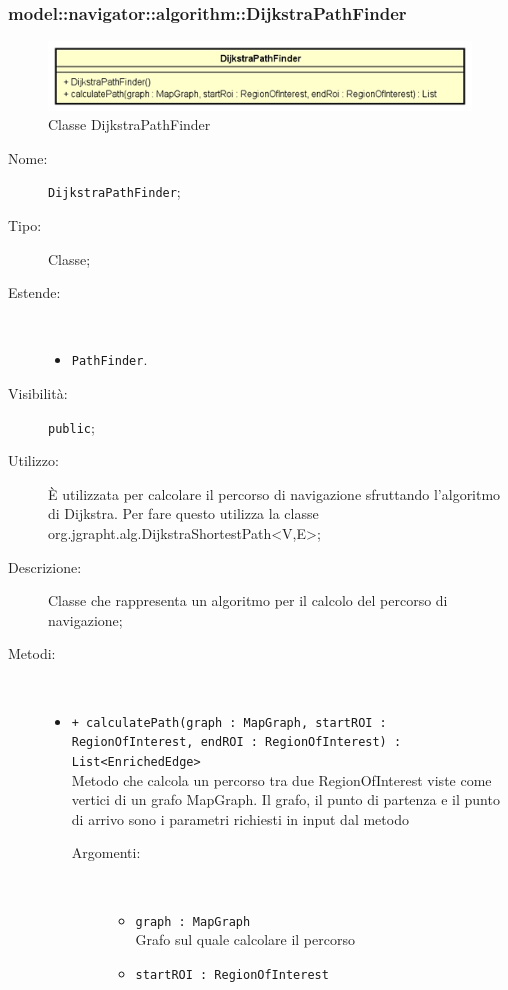 \documentclass[../DefinizioneDiProdotto.tex]{subfiles}
\begin{document}
\subsubsection{model::navigator::algorithm::DijkstraPathFinder}

    \begin{figure}[H]
        \centering
        \includegraphics{img/DijkstraPathFinder.png}
        \caption{Classe DijkstraPathFinder}\label{fig:model::navigator::algorithm::DijkstraPathFinder} 
    \end{figure}
    \begin{description}
\item[Nome:] \texttt{DijkstraPathFinder};
\item[Tipo:] Classe;
\item[Estende:] \
\begin{itemize}
\item \texttt{PathFinder}.
\end{itemize}
\item[Visibilità:] \texttt{public};
\item[Utilizzo:] È utilizzata per calcolare il percorso di navigazione sfruttando l'algoritmo di Dijkstra. Per fare questo utilizza la classe org.jgrapht.alg.DijkstraShortestPath<V,E>;
\item[Descrizione:] Classe che rappresenta un algoritmo per il calcolo del percorso di navigazione;
\item[Metodi:] \
\begin{itemize}
\item \texttt{+ calculatePath(graph : MapGraph, startROI : RegionOfInterest, endROI : RegionOfInterest) : List<EnrichedEdge>}\\
Metodo che calcola un percorso tra due RegionOfInterest viste come vertici di un grafo MapGraph. Il grafo, il punto di partenza e il punto di arrivo sono i parametri richiesti in input dal metodo
 \begin{description}
\item[Argomenti:] \
\begin{itemize}
\item \texttt{graph : MapGraph}\\
Grafo sul quale calcolare il percorso\item \texttt{startROI : RegionOfInterest}\\

\end{itemize}
\end{description}
\end{itemize}
\end{description}
\end{document}
